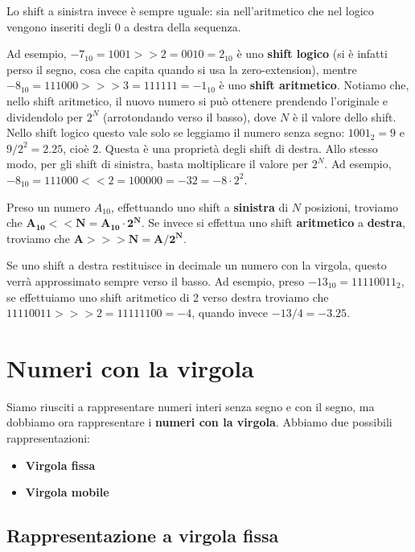 \documentclass[11pt, a4paper, titlepage, oneside]{scrbook}
\begin{document}
Lo shift a sinistra invece è sempre uguale: sia nell'aritmetico che nel logico vengono inseriti degli 0 a destra della sequenza.

Ad esempio, $-7_{10} = 1001 \bm{>>} 2 = 0010 = 2_{10}$ è uno \textbf{shift logico} (si è infatti perso il segno, cosa che capita quando si usa la zero-extension), mentre $-8_{10} = 111000 \bm{>>>} 3 = 111111 = -1_{10}$ è uno \textbf{shift aritmetico}. Notiamo che, nello shift aritmetico, il nuovo numero si può ottenere prendendo l'originale e dividendolo per $2^N$ (arrotondando verso il basso), dove $N$ è il valore dello shift. Nello shift logico questo vale solo se leggiamo il numero senza segno: $1001_2 = 9$ e $9 / 2^2 = 2.25$, cioè $2$. Questa è una proprietà degli shift di destra. Allo stesso modo, per gli shift di sinistra, basta moltiplicare il valore per $2^N$. Ad esempio, $-8_{10} = 111000 << 2 = 100000 = -32 = -8 \cdot 2^2$.  

\begin{Proposizione}
\label{propos-calcolare-decimale-post-shift}
Preso un numero $A_{10}$, effettuando uno shift a \textbf{sinistra} di $N$ posizioni, troviamo che $\bm{A_{10} << N = A_{10} \cdot 2^N}$. Se invece si effettua uno shift \textbf{aritmetico} a \textbf{destra}, troviamo che $\bm{A >>> N = A / 2^N}$.  
\end{Proposizione}

Se uno shift a destra restituisce in decimale un numero con la virgola, questo verrà approssimato sempre verso il basso. Ad esempio, preso $-13_{10} = 11110011_2$, se effettuiamo uno shift aritmetico di 2 verso destra troviamo che $11110011 >>> 2 = 11111100 = -4$, quando invece $-13/4 = -3.25$.


\section{Numeri con la virgola}

Siamo riusciti a rappresentare numeri interi senza segno e con il segno, ma dobbiamo ora rappresentare i \textbf{numeri con la virgola}. Abbiamo due possibili rappresentazioni: 
\begin{itemize}
    \item \textbf{Virgola fissa}
    \item \textbf{Virgola mobile}
\end{itemize}

\subsection{Rappresentazione a virgola fissa}
\end{document}
